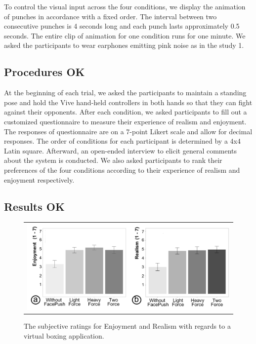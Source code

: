 To control the visual input across the four conditions, we display the animation of punches in accordance with a fixed order. The interval between two consecutive punches is 4 seconds long and each punch lasts approximately 0.5 seconds. The entire clip of animation for one condition runs for one minute. We asked the participants to wear earphones emitting pink noise as in the study 1.

\subsection{Procedures OK}
At the beginning of each trial, we asked the participants to maintain a standing pose and hold the Vive hand-held controllers in both hands so that they can fight against their opponents. After each condition, we asked participants to fill out a customized questionnaire to measure their experience of realism and enjoyment. The responses of questionnaire are on a 7-point Likert scale and allow for decimal responses. The order of conditions for each participant is determined by a 4x4 Latin square. Afterward, an open-ended interview to elicit general comments about the system is conducted. We also asked participants to rank their preferences of the four conditions according to their experience of realism and enjoyment respectively.

\subsection{Results OK}

\begin{figure}[h]
    \begin{center}
        \begin{tabular}{@{\hspace{0.1cm}}c}
        \includegraphics[width=1\linewidth]{figures/enjoymentrealism.png}
        \end{tabular}
        \caption{The subjective ratings for Enjoyment and Realism with regards to a virtual boxing application.}
        \label{fig:enjoymentrealism}
    \end{center}
\end{figure}

